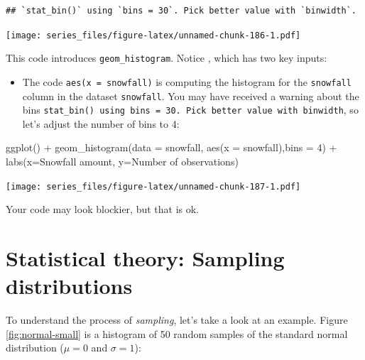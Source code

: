 \documentclass[
]{book}
\newenvironment{Shaded}{\begin{snugshade}}{\end{snugshade}}
\newcommand{\AttributeTok}[1]{\textcolor[rgb]{0.77,0.63,0.00}{#1}}
\newcommand{\DecValTok}[1]{\textcolor[rgb]{0.00,0.00,0.81}{#1}}
\newcommand{\FunctionTok}[1]{\textcolor[rgb]{0.00,0.00,0.00}{#1}}
\newcommand{\NormalTok}[1]{#1}
\newcommand{\SpecialCharTok}[1]{\textcolor[rgb]{0.00,0.00,0.00}{#1}}
\newcommand{\StringTok}[1]{\textcolor[rgb]{0.31,0.60,0.02}{#1}}
\providecommand{\tightlist}{%
  \setlength{\itemsep}{0pt}\setlength{\parskip}{0pt}}
\theoremstyle{definition}
\theoremstyle{definition}
\theoremstyle{definition}
\theoremstyle{remark}
\begin{document}
\begin{verbatim}
## `stat_bin()` using `bins = 30`. Pick better value with `binwidth`.
\end{verbatim}

\texttt{[image: series\_files/figure-latex/unnamed-chunk-186-1.pdf]}

This code introduces \texttt{geom\_histogram}. Notice , which has two key inputs:

\begin{itemize}
\tightlist
\item
  The code \texttt{aes(x\ =\ snowfall)} is computing the histogram for the \texttt{snowfall} column in the dataset \texttt{snowfall}. You may have received a warning about the bins \texttt{stat\_bin()\textasciigrave{}\ using\ \textasciigrave{}bins\ =\ 30\textasciigrave{}.\ Pick\ better\ value\ with\ \textasciigrave{}binwidth}, so let's adjust the number of bins to 4:
\end{itemize}

\begin{Shaded}
\begin{Highlighting}[]
\FunctionTok{ggplot}\NormalTok{() }\SpecialCharTok{+} 
  \FunctionTok{geom\_histogram}\NormalTok{(}\AttributeTok{data =}\NormalTok{ snowfall, }\FunctionTok{aes}\NormalTok{(}\AttributeTok{x =}\NormalTok{ snowfall),}\AttributeTok{bins =} \DecValTok{4}\NormalTok{) }\SpecialCharTok{+}
  \FunctionTok{labs}\NormalTok{(}\AttributeTok{x=}\StringTok{\textquotesingle{}Snowfall amount\textquotesingle{}}\NormalTok{,}
       \AttributeTok{y=}\StringTok{\textquotesingle{}Number of observations\textquotesingle{}}\NormalTok{)}
\end{Highlighting}
\end{Shaded}

\texttt{[image: series\_files/figure-latex/unnamed-chunk-187-1.pdf]}

Your code may look blockier, but that is ok.

\hypertarget{statistical-theory-sampling-distributions}{%
\section{Statistical theory: Sampling distributions}\label{statistical-theory-sampling-distributions}}

To understand the process of \emph{sampling}, let's take a look at an example. Figure \ref{fig:normal-small} is a histogram of 50 random samples of the standard normal distribution (\(\mu=0\) and \(\sigma = 1\)):
\end{document}
